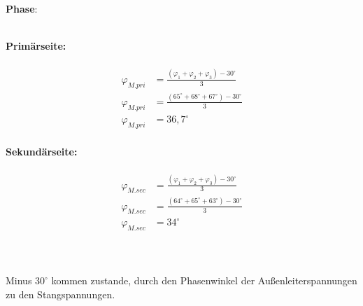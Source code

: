 \begin{enumerate}[label=\alph*)]
	      \textbf{Phase}:\\\ \\
	      \begin{tcolorbox}[colback=gray!30,
			      colframe=black,
			      width=0.9\textwidth,
		      ]
		      \parbox{\textwidth}{

			      \begin{minipage}{0.5\textwidth}
				      \textbf{Primärseite:}\\ \ \\
				      \begin{align*}
					      \varphi_{M.pri} & = \frac{(\varphi_{1} + \varphi_{2} + \varphi_{3})-30^\circ}{3} \\
					      \varphi_{M.pri} & = \frac{(65^\circ+68^\circ+67^\circ)-30^\circ}{3}              \\
					      \varphi_{M.pri} & = 36,7^\circ                                                   \\
				      \end{align*}
			      \end{minipage}\hfill
			      \begin{minipage}{0.5\textwidth}
				      \textbf{Sekundärseite:}\\ \ \\
				      \begin{align*}
					      \varphi_{M.sec} & = \frac{(\varphi_{1} + \varphi_{2} + \varphi_{3})-30^\circ}{3} \\
					      \varphi_{M.sec} & = \frac{(64^\circ+65^\circ+63^\circ)-30^\circ}{3}              \\
					      \varphi_{M.sec} & = 34^\circ                                                     \\
				      \end{align*}
			      \end{minipage}
			      \\ \ \\
			      \centering
			      Minus $30^\circ$ kommen zustande, durch den Phasenwinkel der Außenleiterspannungen zu den Stangspannungen.
		      }
	      \end{tcolorbox}


\end{enumerate}
